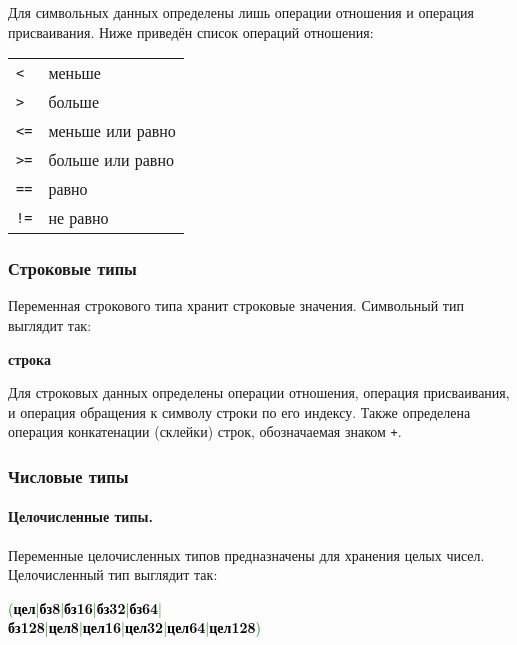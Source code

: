 \documentclass[10pt]{report}
\begin{document}
Для символьных данных определены лишь операции отношения и операция присваивания. Ниже приведён список операций отношения:

\begin{tabular}{ll}
 \texttt{<}         & меньше                                        \\
 \texttt{>}         & больше                                        \\
 \texttt{<=}        & меньше или равно                              \\
 \texttt{>=}        & больше или равно                              \\
 \texttt{==}        & равно                                         \\
 \texttt{!=}        & не равно                                      \\
\end{tabular}

        \subsubsection{Строковые типы}
Переменная строкового типа хранит строковые значения. Символьный тип выглядит так:
\begin{center}
\noindent\textbf{строка}
\end{center}

Для строковых данных определены операции отношения, операция присваивания, и операция обращения к символу строки по его индексу. Также определена операция конкатенации (склейки) строк, обозначаемая знаком \glqq\texttt{+}\grqq.

        \subsubsection{Числовые типы}
            \paragraph{Целочисленные типы.}Переменные целочисленных типов предназначены для хранения целых чисел. Целочисленный тип выглядит так:
\begin{center}
\noindent\textcolor{Green}{(\textcolor{Black}{\textbf{цел}}|\textcolor{Black}{\textbf{бз8}}|\textcolor{Black}{\textbf{бз16}}|\textcolor{Black}{\textbf{бз32}}|\textcolor{Black}{\textbf{бз64}}|\\
\textcolor{Black}{\textbf{бз128}}|\textcolor{Black}{\textbf{цел8}}|\textcolor{Black}{\textbf{цел16}}|\textcolor{Black}{\textbf{цел32}}|\textcolor{Black}{\textbf{цел64}}|\textcolor{Black}{\textbf{цел128}})}
\end{center}
\end{document}
